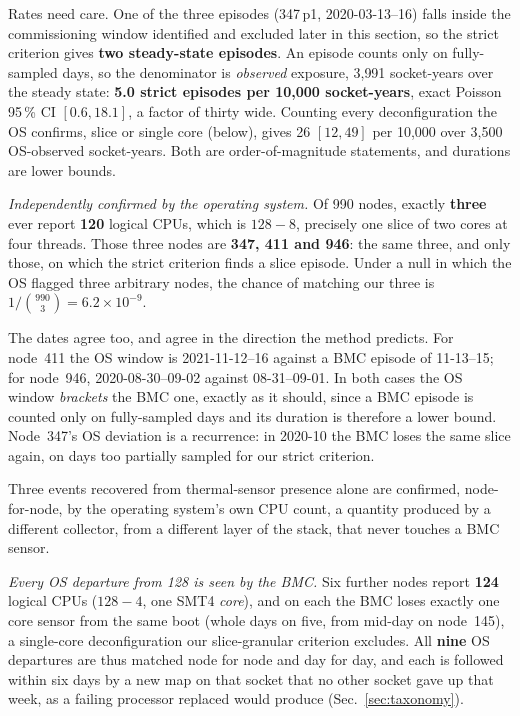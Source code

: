 \documentclass[10pt,conference]{IEEEtran}
\begin{document}
Rates need care. One of the three episodes (347\,p1, 2020-03-13--16) falls inside the
commissioning window identified and excluded later in this section, so the strict criterion gives
\textbf{two steady-state episodes}. An episode counts only on fully-sampled days, so the
denominator is \emph{observed} exposure, 3{,}991 socket-years over the steady state:
\textbf{5.0 strict episodes per 10{,}000 socket-years}, exact Poisson 95\,\% CI $[0.6,18.1]$, a
factor of thirty wide. Counting every deconfiguration the OS confirms, slice or single core
(below), gives 26 $[12,49]$ per 10{,}000 over 3{,}500 OS-observed socket-years. Both are
order-of-magnitude statements, and durations are lower bounds.

\emph{Independently confirmed by the operating system.} Of 990 nodes, exactly \textbf{three} ever
report \textbf{120} logical CPUs, which is $128-8$, precisely one slice of two cores at four
threads. Those three nodes are \textbf{347, 411 and 946}: the same three, and only those, on which
the strict criterion finds a slice episode. Under a null in which the OS flagged three arbitrary nodes, the
chance of matching our three is $1/\binom{990}{3}=6.2\times10^{-9}$.

The dates agree too, and agree in the direction the method predicts. For node~411 the OS window is
2021-11-12--16 against a BMC episode of 11-13--15; for node~946, 2020-08-30--09-02 against
08-31--09-01. In both cases the OS window \emph{brackets} the BMC one, exactly as it should, since
a BMC episode is counted only on fully-sampled days and its duration is therefore a lower bound.
Node~347's OS deviation is a recurrence: in 2020-10 the BMC loses the same slice again, on days
too partially sampled for our strict criterion.

Three events recovered from thermal-sensor presence
alone are confirmed, node-for-node, by the operating system's own CPU count, a quantity produced
by a different collector, from a different layer of the stack, that never touches a BMC sensor.

\emph{Every OS departure from 128 is seen by the BMC.} Six further nodes report \textbf{124}
logical CPUs ($128-4$, one SMT4 \emph{core}), and on each the BMC loses exactly one core sensor
from the same boot (whole days on five, from mid-day on node~145), a single-core deconfiguration
our slice-granular criterion excludes. All \textbf{nine} OS departures are thus matched node for
node and day for day, and each is followed within six days by a new map on that socket that no
other socket gave up that week, as a failing processor replaced would produce
(Sec.~\ref{sec:taxonomy}).
\end{document}
